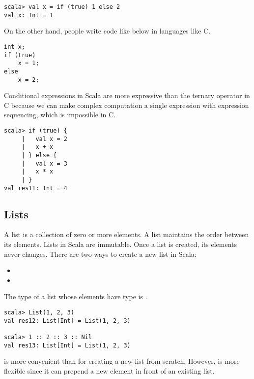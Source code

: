 \begin{verbatim}
scala> val x = if (true) 1 else 2
val x: Int = 1
\end{verbatim}

On the other hand, people write code like below in languages like C.

\begin{verbatim}
int x;
if (true)
    x = 1;
else
    x = 2;
\end{verbatim}

Conditional expressions in Scala are more expressive than the ternary operator
in C because we can make complex computation a single expression with expression
sequencing, which is impossible in C.

\begin{verbatim}
scala> if (true) {
     |   val x = 2
     |   x + x
     | } else {
     |   val x = 3
     |   x * x
     | }
val res11: Int = 4
\end{verbatim}

\subsection{Lists}

A list is a collection of zero or more elements. A list maintains the order between
its elements. Lists in Scala are immutable. Once a list is created, its elements
never changes. There are two ways to create a new list in Scala:

\begin{itemize}
  \item {}
  \item {}
\end{itemize}

The type of a list whose elements have type  is .

\begin{verbatim}
scala> List(1, 2, 3)
val res12: List[Int] = List(1, 2, 3)

scala> 1 :: 2 :: 3 :: Nil
val res13: List[Int] = List(1, 2, 3)
\end{verbatim}

 is more convenient than \code{::} for creating a new list from
scratch. However, \code{::} is more flexible since it can prepend a new element
in front of an existing list.

